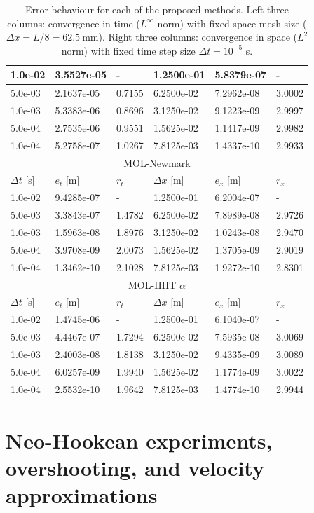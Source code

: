 \documentclass{sfuthesis}
\numberwithin{equation}{section}
\numberwithin{figure}{chapter}
\numberwithin{table}{chapter}
\theoremstyle{definition}
\begin{document}
\begin{table}
\begin{tabular}{|l|l|l|l|l|l|}
        1.0e-02&3.5527e-05&-&1.2500e-01&5.8379e-07&-\\\hline
        5.0e-03&2.1637e-05&0.7155&6.2500e-02&7.2962e-08&3.0002\\\hline
        1.0e-03&5.3383e-06&0.8696&3.1250e-02&9.1223e-09&2.9997\\\hline
        5.0e-04&2.7535e-06&0.9551&1.5625e-02&1.1417e-09&2.9982\\\hline
        1.0e-04&5.2758e-07&1.0267&7.8125e-03&1.4337e-10&2.9933\\\hline\hline
        \multicolumn{6}{|c|}{MOL-Newmark} \\\hline
        $\Delta t$ [s] & $e_t$ [m] & $r_t$ & $\Delta x$ [m] & $e_x$ [m] & $r_x$ \\\hline
        1.0e-02&9.4285e-07&-&1.2500e-01&6.2004e-07&-\\\hline
        5.0e-03&3.3843e-07&1.4782&6.2500e-02&7.8989e-08&2.9726\\\hline
        1.0e-03&1.5963e-08&1.8976&3.1250e-02&1.0243e-08&2.9470\\\hline
        5.0e-04&3.9708e-09&2.0073&1.5625e-02&1.3705e-09&2.9019\\\hline
        1.0e-04&1.3462e-10&2.1028&7.8125e-03&1.9272e-10&2.8301\\\hline\hline
        \multicolumn{6}{|c|}{MOL-HHT $\alpha$} \\\hline
        $\Delta t$ [s] & $e_t$ [m] & $r_t$ & $\Delta x$ [m] & $e_x$ [m] & $r_x$ \\\hline
        1.0e-02&1.4745e-06&-&1.2500e-01&6.1040e-07&-\\\hline
        5.0e-03&4.4467e-07&1.7294&6.2500e-02&7.5935e-08&3.0069\\\hline
        1.0e-03&2.4003e-08&1.8138&3.1250e-02&9.4335e-09&3.0089\\\hline
        5.0e-04&6.0257e-09&1.9940&1.5625e-02&1.1774e-09&3.0022\\\hline
        1.0e-04&2.5532e-10&1.9642&7.8125e-03&1.4774e-10&2.9944\\\hline
    \end{tabular} 
    \caption{Error behaviour for each of the proposed methods. Left three columns: convergence in time ($L^\infty$ norm) with fixed space mesh size ($\Delta x = L/8 = 62.5 \ \text{mm}$). Right three columns: convergence in space ($L^2$ norm) with fixed time step size $\Delta t = 10^{-5}$ s. \label{tab:convergence_linear_elasticty_1d}}
\end{table}

\section{Neo-Hookean experiments, overshooting, and velocity approximations}
\end{document}
